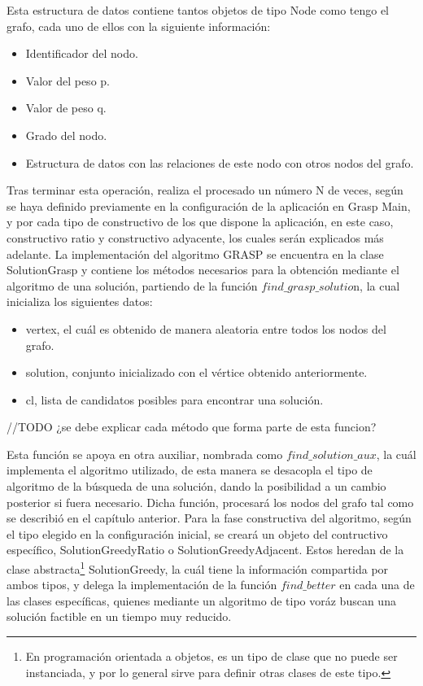 Esta estructura de datos contiene tantos objetos de tipo Node como tengo el grafo, cada uno de ellos con la siguiente información:
 \begin{itemize}
	\item Identificador del nodo.
	\item Valor del peso p.
	\item Valor de peso q.
	\item Grado del nodo.
	\item Estructura de datos con las relaciones de este nodo con otros nodos del grafo.
\end{itemize}

Tras terminar esta operación, realiza el procesado un número N de veces, según se haya definido previamente en la configuración de la aplicación en Grasp Main, y por cada tipo de constructivo de los que dispone la aplicación, en este caso, constructivo ratio y constructivo adyacente, los cuales serán explicados más adelante. 
La implementación del algoritmo \gls{GRASP} se encuentra en la clase SolutionGrasp y contiene los métodos necesarios para la obtención mediante el algoritmo de una solución, partiendo de la función $find\_grasp\_solutio$n, la cual inicializa los siguientes datos:
\begin{itemize}
	\item vertex, el cuál es obtenido de manera aleatoria entre todos los nodos del grafo.
	\item solution, conjunto inicializado con el vértice obtenido anteriormente.
	\item cl, lista de candidatos posibles para encontrar una solución.
\end{itemize}

//TODO ¿se debe explicar cada método que forma parte de esta funcion?

Esta función se apoya en otra auxiliar, nombrada como $ find\_solution\_aux $, la cuál implementa el algoritmo utilizado, de esta manera se desacopla el tipo de algoritmo de la búsqueda de una solución, dando la posibilidad a un cambio posterior si fuera necesario. Dicha función, procesará los nodos del grafo tal como se describió en el capítulo anterior. Para la fase constructiva del algoritmo, según el tipo elegido en la configuración inicial, se creará un objeto del contructivo específico, SolutionGreedyRatio o SolutionGreedyAdjacent. Estos heredan de la clase abstracta\footnote{En programación orientada a objetos, es un tipo de clase que no puede ser instanciada, y por lo general sirve para definir otras clases de este tipo.} SolutionGreedy, la cuál tiene la información compartida por ambos tipos, y delega la implementación de la función $find\_better$ en cada una de las clases específicas, quienes mediante un algoritmo de tipo voráz buscan una solución factible en un tiempo muy reducido.

